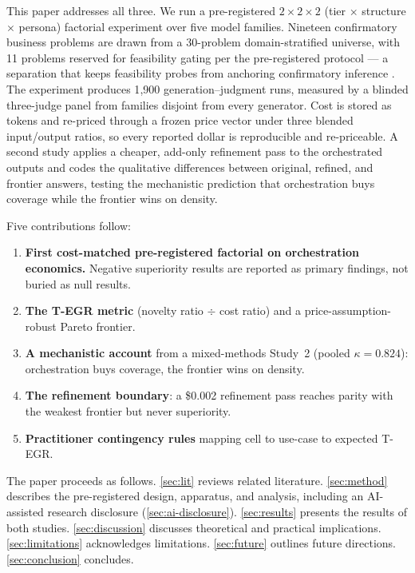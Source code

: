 \documentclass[12pt,a4paper]{article}
\begin{document}
This paper addresses all three. We run a pre-registered $2 \times 2 \times 2$
(tier $\times$ structure $\times$ persona) factorial experiment over five model
families. Nineteen confirmatory business problems are drawn from a 30-problem
domain-stratified universe, with 11 problems reserved for feasibility gating per
the pre-registered protocol --- a separation that keeps feasibility probes from
anchoring confirmatory inference \citep{AlbersLakens2018}. The experiment
produces 1{,}900 generation--judgment runs, measured by a blinded three-judge
panel from families disjoint from every generator. Cost is stored as tokens and re-priced
through a frozen price vector under three blended input/output ratios, so every
reported dollar is reproducible and re-priceable. A second study applies a
cheaper, add-only refinement pass to the orchestrated outputs and codes the
qualitative differences between original, refined, and frontier answers,
testing the mechanistic prediction that orchestration buys coverage while the
frontier wins on density.

Five contributions follow:
\begin{enumerate}[leftmargin=*,nosep]
  \item \textbf{First cost-matched pre-registered factorial on orchestration
        economics.} Negative superiority results are reported as primary
        findings, not buried as null results.
  \item \textbf{The T-EGR metric} (novelty ratio $\div$ cost ratio) and a
        price-assumption-robust Pareto frontier.
  \item \textbf{A mechanistic account} from a mixed-methods Study~2 (pooled
        $\kappa = 0.824$): orchestration buys coverage, the frontier wins on
        density.
  \item \textbf{The refinement boundary}: a \$0.002 refinement pass reaches
        parity with the weakest frontier but never superiority.
  \item \textbf{Practitioner contingency rules} mapping cell to use-case to
        expected T-EGR.
\end{enumerate}

The paper proceeds as follows. \cref{sec:lit} reviews related literature.
\cref{sec:method} describes the pre-registered design, apparatus, and analysis,
including an AI-assisted research disclosure (\cref{sec:ai-disclosure}).
\cref{sec:results} presents the results of both studies. \cref{sec:discussion}
discusses theoretical and practical implications. \cref{sec:limitations}
acknowledges limitations. \cref{sec:future} outlines future directions.
\cref{sec:conclusion} concludes.
\end{document}
